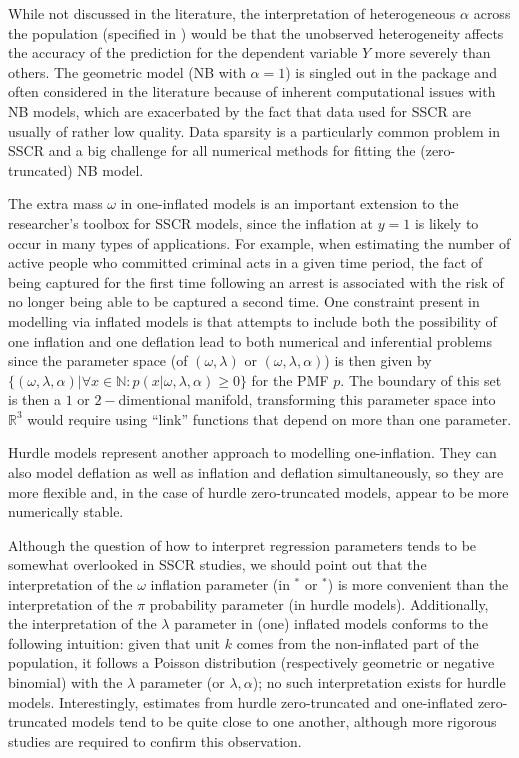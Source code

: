 \documentclass[
]{jss}
\newcommand{\1}{\mathcal{I}} \newcommand{\bZero}{\boldsymbol{0}}
\begin{document}
While not discussed in the literature, the interpretation of
heterogeneous \(\alpha\) across the population (specified in
) would be that the unobserved heterogeneity affects
the accuracy of the prediction for the dependent variable \(Y\) more
severely than others. The geometric model (NB with \(\alpha=1\)) is
singled out in the package and often considered in the literature
because of inherent computational issues with NB models, which are
exacerbated by the fact that data used for SSCR are usually of rather
low quality. Data sparsity is a particularly common problem in SSCR and
a big challenge for all numerical methods for fitting the
(zero-truncated) NB model.

The extra mass \(\omega\) in one-inflated models is an important
extension to the researcher's toolbox for SSCR models, since the
inflation at \(y=1\) is likely to occur in many types of applications.
For example, when estimating the number of active people who committed
criminal acts in a given time period, the fact of being captured for the
first time following an arrest is associated with the risk of no longer
being able to be captured a second time. One constraint present in
modelling via inflated models is that attempts to include both the
possibility of one inflation and one deflation lead to both numerical
and inferential problems since the parameter space (of
\((\omega, \lambda)\) or \((\omega, \lambda, \alpha)\)) is then given by
\(\{(\omega, \lambda, \alpha) | \forall x\in \mathbb{N}: p(x|\omega, \lambda, \alpha)\geq0\}\)
for the PMF \(p\). The boundary of this set is then a \(1\) or
\(2-\)dimentional manifold, transforming this parameter space into
\(\mathbb{R}^{3}\) would require using ``link'' functions that depend on
more than one parameter.

Hurdle models represent another approach to modelling one-inflation.
They can also model deflation as well as inflation and deflation
simultaneously, so they are more flexible and, in the case of hurdle
zero-truncated models, appear to be more numerically stable.

Although the question of how to interpret regression parameters tends to
be somewhat overlooked in SSCR studies, we should point out that the
interpretation of the \(\omega\) inflation parameter (in
\(^\ast\) or \(^\ast\)) is more convenient than
the interpretation of the \(\pi\) probability parameter (in hurdle
models). Additionally, the interpretation of the \(\lambda\) parameter
in (one) inflated models conforms to the following intuition: given that
unit \(k\) comes from the non-inflated part of the population, it
follows a Poisson distribution (respectively geometric or negative
binomial) with the \(\lambda\) parameter (or \(\lambda,\alpha\)); no
such interpretation exists for hurdle models. Interestingly, estimates
from hurdle zero-truncated and one-inflated zero-truncated models tend
to be quite close to one another, although more rigorous studies are
required to confirm this observation.
\end{document}
